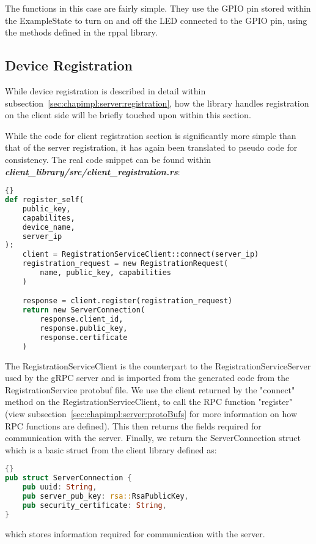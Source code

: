 The functions in this case are fairly simple. They use the GPIO pin stored within the ExampleState to turn on and off the LED connected to the GPIO pin, using the methods defined in the rppal library.

\subsection{Device Registration} \label{sec:chapimpl:devicelib:registration}
While device registration is described in detail within subsection~\ref{sec:chapimpl:server:registration}, how the library handles registration on the client side will be briefly touched upon within this section.

While the code for client registration section is significantly more simple than that of the server registration, it has again been translated to pseudo code for consistency. The real code snippet can be found within \textit{\textbf{client\_library/src/client\_registration.rs}}: 
\begin{lstlisting}[language=Python, style=boxed, showstringspaces=false]{}
def register_self(
    public_key,
    capabilites,
    device_name,
    server_ip
):
    client = RegistrationServiceClient::connect(server_ip)
    registration_request = new RegistrationRequest(
        name, public_key, capabilities
    )

    response = client.register(registration_request)
    return new ServerConnection(
        response.client_id,
        response.public_key,
        response.certificate
    )
\end{lstlisting}
The RegistrationServiceClient is the counterpart to the RegistrationServiceServer used by the gRPC server and is imported from the generated code from the RegistrationService protobuf file. We use the client returned by the "connect" method on the RegistrationServiceClient, to call the RPC function "register" (view subsection~\ref{sec:chapimpl:server:protoBufs} for more information on how RPC functions are defined). This then returns the fields required for communication with the server. Finally, we return the ServerConnection struct which is a basic struct from the client library defined as:
\begin{lstlisting}[language=Rust, style=boxed, showstringspaces=false]{}
pub struct ServerConnection {
    pub uuid: String,
    pub server_pub_key: rsa::RsaPublicKey,
    pub security_certificate: String,
}
\end{lstlisting}
which stores information required for communication with the server. 

